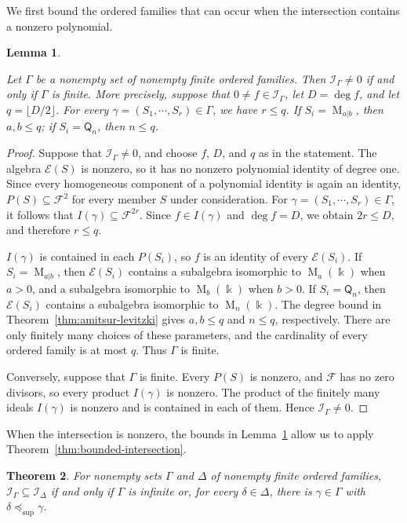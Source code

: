 \documentclass[11pt,reqno]{amsart}
\newcommand{\kk}{\Bbbk}
\newcommand{\F}{\mathcal F}
\newcommand{\E}{\mathcal E}
\newcommand{\Mat}{\operatorname{M}}
\newcommand{\Qtype}{\mathsf Q}
\newtheorem{theorem}{Theorem}[section]
\newtheorem{lemma}[theorem]{Lemma}
\theoremstyle{definition}
\theoremstyle{remark}
\numberwithin{equation}{section}
\begin{document}
We first bound the ordered families that can occur when
the intersection contains a nonzero polynomial.

\begin{lemma}\label{lem:intersection-degree-bounds}

Let $\Gamma$ be a nonempty set of nonempty finite ordered families.
Then $\mathcal I_\Gamma\ne0$ if and only if $\Gamma$ is finite.
More precisely, suppose that $0\ne f\in\mathcal I_\Gamma$,
let $D=\deg f$,
and let $q=\lfloor D/2\rfloor$.
For every $\gamma=(S_1,\cdots,S_r)\in\Gamma$, we have
$r\leq q$.
If $S_i=\Mat_{a|b}$, then $a,b\leq q$;
if $S_i=\Qtype_n$, then $n\leq q$.
\end{lemma}

\begin{proof}
Suppose that $\mathcal I_\Gamma\ne0$, and choose $f$, $D$,
and $q$ as in the statement.
The algebra $\E(S)$ is nonzero, so it has no nonzero
polynomial identity of degree one. Since every homogeneous component of
a polynomial identity is again an identity,
 $P(S)\subseteq\F^2$ for every member $S$ under
consideration.
For $\gamma=(S_1,\cdots,S_r)\in\Gamma$, it follows that
$I(\gamma)\subseteq\F^{2r}$.
Since $f\in I(\gamma)$ and $\deg f=D$, we obtain
$2r\leq D$, and therefore $r\leq q$.

 $I(\gamma)$ is contained in each 
 $P(S_i)$, so $f$ is an identity of every
$\E(S_i)$.
If $S_i=\Mat_{a|b}$, then $\E(S_i)$ contains a subalgebra
isomorphic to $\Mat_a(\kk)$ when $a>0$, and a subalgebra
isomorphic to $\Mat_b(\kk)$ when $b>0$. If $S_i=\Qtype_n$, then $\E(S_i)$ contains a subalgebra
isomorphic to $\Mat_n(\kk)$. The degree bound in Theorem~\ref{thm:amitsur-levitzki}
 gives $a,b\leq q$ and $n\leq q$, respectively.
There are only finitely many choices of these parameters,
and the cardinality of every ordered family is at most $q$.
Thus $\Gamma$ is finite.

Conversely, suppose that $\Gamma$ is finite.
Every $P(S)$ is nonzero, and $\F$ has no zero
divisors, so every product $I(\gamma)$ is nonzero.
The product of the finitely many ideals $I(\gamma)$ is nonzero and is contained
in each of them.
Hence $\mathcal I_\Gamma\ne0$.
\end{proof}

When the intersection is nonzero, the bounds in
Lemma~\ref{lem:intersection-degree-bounds} allow us
to apply Theorem~\ref{thm:bounded-intersection}.



\begin{theorem}\label{thm:intersection-capacity}
For nonempty sets $\Gamma$ and $\Delta$ of nonempty finite ordered
families, $\mathcal I_\Gamma\subseteq\mathcal I_\Delta$
if and only if $\Gamma$ is infinite or, for every
$\delta\in\Delta$, there is $\gamma\in\Gamma$ with
$\delta\preceq_{\mathrm{sup}}\gamma$.
\end{theorem}
\end{document}
